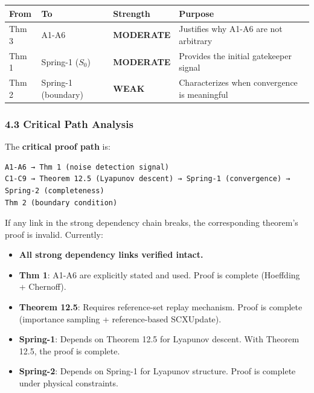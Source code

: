 \documentclass[
  12pt,
]{ctexart}
\providecommand{\tightlist}{%
  \setlength{\itemsep}{0pt}\setlength{\parskip}{0pt}}
\begin{document}
\begin{longtable}[]{@{}
  >{\raggedright\arraybackslash}p{}
  >{\raggedright\arraybackslash}p{}
  >{\raggedright\arraybackslash}p{}
  >{\raggedright\arraybackslash}p{}@{}}
\toprule\noalign{}
\begin{minipage}[b]{\linewidth}\raggedright
From
\end{minipage} & \begin{minipage}[b]{\linewidth}\raggedright
To
\end{minipage} & \begin{minipage}[b]{\linewidth}\raggedright
Strength
\end{minipage} & \begin{minipage}[b]{\linewidth}\raggedright
Purpose
\end{minipage} \\
\midrule\noalign{}
\endhead
\bottomrule\noalign{}
\endlastfoot
Thm 3 & A1-A6 & \textbf{MODERATE} & Justifies why A1-A6 are not
arbitrary \\
Thm 1 & Spring-1 (\(S_0\)) & \textbf{MODERATE} & Provides the initial
gatekeeper signal \\
Thm 2 & Spring-1 (boundary) & \textbf{WEAK} & Characterizes when
convergence is meaningful \\
\end{longtable}

\subsubsection{4.3 Critical Path Analysis}\label{critical-path-analysis}

The \textbf{critical proof path} is:

\begin{verbatim}
A1-A6 → Thm 1 (noise detection signal)
C1-C9 → Theorem 12.5 (Lyapunov descent) → Spring-1 (convergence) → Spring-2 (completeness)
Thm 2 (boundary condition)
\end{verbatim}

If any link in the strong dependency chain breaks, the corresponding
theorem's proof is invalid. Currently:

\begin{itemize}
\tightlist
\item
  \textbf{All strong dependency links verified intact.}
\item
  \textbf{Thm 1}: A1-A6 are explicitly stated and used. Proof is
  complete (Hoeffding + Chernoff).
\item
  \textbf{Theorem 12.5}: Requires reference-set replay mechanism. Proof
  is complete (importance sampling + reference-based SCXUpdate).
\item
  \textbf{Spring-1}: Depends on Theorem 12.5 for Lyapunov descent. With
  Theorem 12.5, the proof is complete.
\item
  \textbf{Spring-2}: Depends on Spring-1 for Lyapunov structure. Proof
  is complete under physical constraints.
\end{itemize}
\end{document}
